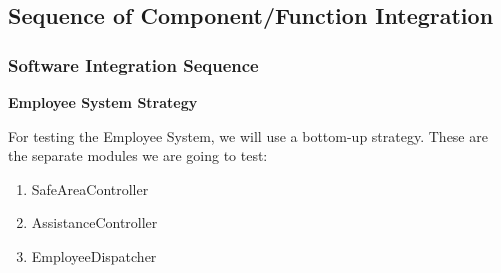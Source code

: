 \documentclass{article}
\begin{document}
\subsection{Sequence of Component/Function Integration}

\subsubsection{Software Integration Sequence}

\begin{Large}
\textbf{Employee System Strategy}
\end{Large}

For testing the Employee System, we will use a bottom-up strategy. These are the separate modules we are going to test: 
\begin{enumerate}
\item SafeAreaController
\item AssistanceController
\item EmployeeDispatcher
\end{enumerate}
\end{document}

